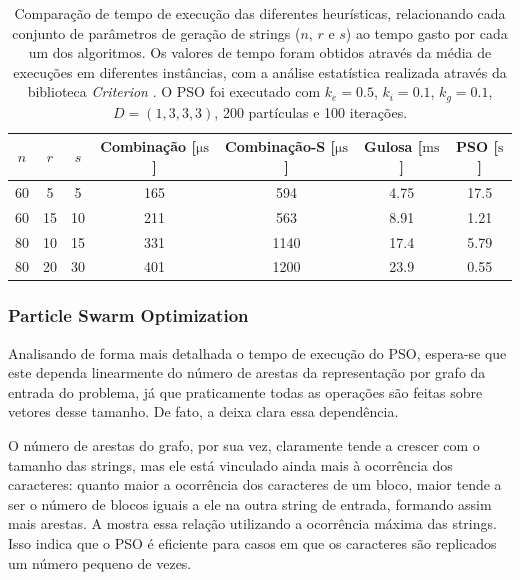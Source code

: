     \begin{table}[htb]
        \centering
        \begin{tabular}{ccc|cccc}
            \toprule
            $n$ & $r$ & $s$ & Combinação [$\unit{\micro\second}$] & Combinação-S [$\unit{\micro\second}$] & Gulosa [$\unit{\milli\second}$] & PSO [$\unit{\second}$] \\
            \midrule
            60 &  5 &  5 & 165 & 594  & 4.75 & 17.5 \\
            60 & 15 & 10 & 211 & 563  & 8.91 & 1.21 \\
            80 & 10 & 15 & 331 & 1140 & 17.4 & 5.79 \\
            80 & 20 & 30 & 401 & 1200 & 23.9 & 0.55 \\
            \bottomrule
        \end{tabular}
        \caption{Comparação de tempo de execução das diferentes heurísticas, relacionando cada conjunto de parâmetros de geração de strings ($n$, $r$ e $s$) ao tempo gasto por cada um dos algoritmos. Os valores de tempo foram obtidos através da média de execuções em diferentes instâncias, com a análise estatística realizada através da biblioteca \textit{Criterion} \cite{noauthor_criterion_nodate}. O PSO foi executado com $k_e = 0.5$, $k_i = 0.1$, $k_g = 0.1$, $D = (1, 3, 3, 3)$, 200 partículas e 100 iterações.}
        \label{tab:bench-tempo}
    \end{table}

    \subsubsection{Particle Swarm Optimization} \label{sec:tempo-pso}

        Analisando de forma mais detalhada o tempo de execução do PSO, espera-se que este dependa linearmente do número de arestas da representação por grafo da entrada do problema, já que praticamente todas as operações são feitas sobre vetores desse tamanho. De fato, a  deixa clara essa dependência.

        O número de arestas do grafo, por sua vez, claramente tende a crescer com o tamanho das strings, mas ele está vinculado ainda mais à ocorrência dos caracteres: quanto maior a ocorrência dos caracteres de um bloco, maior tende a ser o número de blocos iguais a ele na outra string de entrada, formando assim mais arestas. A  mostra essa relação utilizando a ocorrência máxima das strings. Isso indica que o PSO é eficiente para casos em que os caracteres são replicados um número pequeno de vezes.

